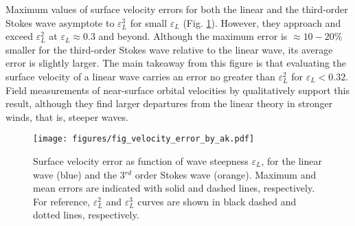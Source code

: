 \documentclass[lineno]{jfm}
\begin{document}
Maximum values of surface velocity errors for both the linear and the
third-order Stokes wave asymptote to $\varepsilon_L^3$ for small
$\varepsilon_L$ (Fig. \ref{fig:velocity_error_by_ak}).
However, they approach and exceed $\varepsilon_L^2$ at $\varepsilon_L \approx 0.3$
and beyond.
Although the maximum error is $\approx 10-20\%$ smaller for the third-order
Stokes wave relative to the linear wave, its average error is slightly larger.
The main takeaway from this figure is that evaluating the surface velocity
of a linear wave carries an error no greater than $\varepsilon_L^2$ for
$\varepsilon_L < 0.32$.
Field measurements of near-surface orbital velocities by
\citet{laxague2020observations} qualitatively support this result, although
they find larger departures from the linear theory in stronger winds, that is,
steeper waves.

\begin{figure}
\centering
\texttt{[image: figures/fig\_velocity\_error\_by\_ak.pdf]}
\caption{
  Surface velocity error as function of wave steepness $\varepsilon_L$,
  for the linear wave (blue) and the 3$^{rd}$ order Stokes wave (orange).
  Maximum and mean errors are indicated with solid and dashed lines,
  respectively.
  For reference, $\varepsilon_L^2$ and $\varepsilon_L^3$ curves are shown in
  black dashed and dotted lines, respectively.
}
\label{fig:velocity_error_by_ak}
\end{figure}



\end{document}
